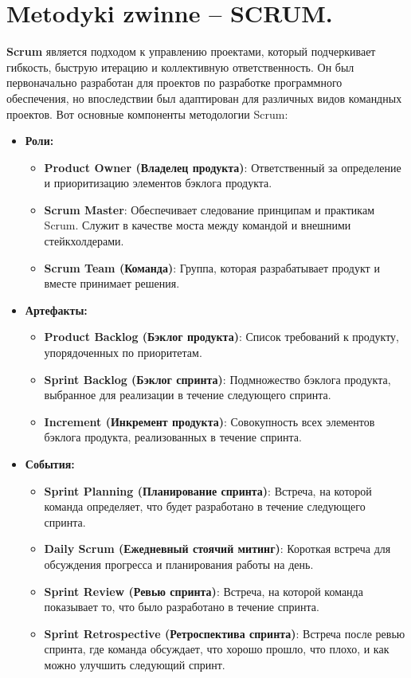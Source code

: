\section{Metodyki zwinne – SCRUM.}

\textbf{Scrum} является подходом к управлению проектами, который подчеркивает гибкость, быструю итерацию и коллективную ответственность. Он был первоначально разработан для проектов по разработке программного обеспечения, но впоследствии был адаптирован для различных видов командных проектов. Вот основные компоненты методологии Scrum:

\begin{itemize}
\item \textbf{Роли:}
\begin{itemize}
\item \textbf{Product Owner (Владелец продукта)}: Ответственный за определение и приоритизацию элементов бэклога продукта.
\item \textbf{Scrum Master}: Обеспечивает следование принципам и практикам Scrum. Служит в качестве моста между командой и внешними стейкхолдерами.
\item \textbf{Scrum Team (Команда)}: Группа, которая разрабатывает продукт и вместе принимает решения.
\end{itemize}
\item \textbf{Артефакты:}
\begin{itemize}
\item \textbf{Product Backlog (Бэклог продукта)}: Список требований к продукту, упорядоченных по приоритетам.
\item \textbf{Sprint Backlog (Бэклог спринта)}: Подмножество бэклога продукта, выбранное для реализации в течение следующего спринта.
\item \textbf{Increment (Инкремент продукта)}: Совокупность всех элементов бэклога продукта, реализованных в течение спринта.
\end{itemize}
\item \textbf{События:}
\begin{itemize}
\item \textbf{Sprint Planning (Планирование спринта)}: Встреча, на которой команда определяет, что будет разработано в течение следующего спринта.
\item \textbf{Daily Scrum (Ежедневный стоячий митинг)}: Короткая встреча для обсуждения прогресса и планирования работы на день.
\item \textbf{Sprint Review (Ревью спринта)}: Встреча, на которой команда показывает то, что было разработано в течение спринта.
\item \textbf{Sprint Retrospective (Ретроспектива спринта)}: Встреча после ревью спринта, где команда обсуждает, что хорошо прошло, что плохо, и как можно улучшить следующий спринт.
\end{itemize}
\end{itemize}

